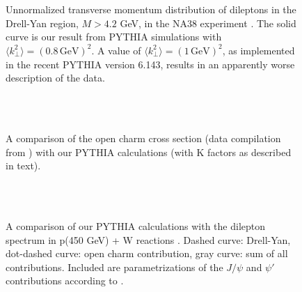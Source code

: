 \begin{figure}[t] %
\centering
~\\[-.1cm]
~\\[.5cm]
\caption{
Unnormalized transverse momentum distribution of dileptons in the Drell-Yan
region, $M > 4.2$ GeV, in the NA38 experiment \protect\cite{NA38}. 
The solid curve is our
result from PYTHIA simulations with 
$\langle k_\perp^2 \rangle = (0.8 \, \mbox{GeV})^2$.
A value of $\langle k_\perp^2 \rangle = (1 \, \mbox{GeV})^2$,
as implemented in the recent PYTHIA version 6.143, results in an apparently
worse description of the data.
}
\label{f_4}
\end{figure}

\begin{figure}[t] %
\centering
~\\[-.1cm]
~\\[.5cm]
\caption{
A comparison of the open charm cross section (data compilation from
\cite{PBM}) with our PYTHIA calculations (with K factors
as described in text).
}
\label{f_13}
\end{figure}

\begin{figure}[t] %
\centering
~\\[-.1cm]
~\\[.5cm]
\caption{
A comparison of our PYTHIA calculations with the dilepton
spectrum in p(450 GeV) + W reactions \protect\cite{pW_Capelli}.
Dashed curve: Drell-Yan,
dot-dashed curve: open charm contribution, 
gray curve: sum of all contributions.
Included are parametrizations of the $J/\psi$ and $\psi'$
contributions according to \protect\cite{pW_Capelli}.
}
\label{f_14}
\end{figure}


